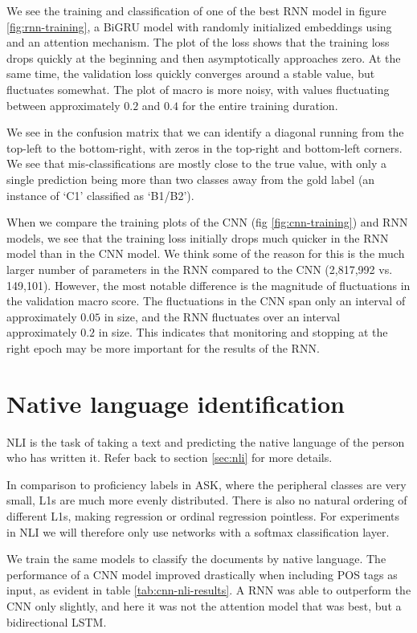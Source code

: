 We see the training and classification of one of the best RNN model in figure
\ref{fig:rnn-training}, a BiGRU model with randomly initialized embeddings
using and an attention mechanism. The plot of the loss shows that the
training loss drops quickly at the beginning and then asymptotically
approaches zero. At the same time, the validation loss quickly converges
around a stable value, but fluctuates somewhat. The plot of macro \FI is more
noisy, with values fluctuating between approximately $0.2$ and $0.4$ for the
entire training duration.

We see in the confusion matrix that we can identify a diagonal running from
the top-left to the bottom-right, with zeros in the top-right and bottom-left
corners. We see that mis-classifications are mostly close to the true value,
with only a single prediction being more than two classes away from the gold
label (an instance of `C1' classified as `B1/B2').

When we compare the training plots of the CNN (fig \ref{fig:cnn-training})
and RNN models, we see that the training loss initially drops much quicker in
the RNN model than in the CNN model. We think some of the reason for this is
the much larger number of parameters in the RNN compared to the CNN
(2,817,992 vs. 149,101). However, the most notable difference is the
magnitude of fluctuations in the validation macro \FI score. The fluctuations
in the CNN span only an interval of approximately $0.05$ in size, and the RNN
fluctuates over an interval approximately $0.2$ in size. This indicates that
monitoring \FI and stopping at the right epoch may be more important for the
results of the RNN.


\section{Native language identification} \label{sec:nli-experiments}

\ac{NLI} is the task of taking a text and predicting the native language of
the person who has written it. Refer back to section \ref{sec:nli} for more
details.

In comparison to proficiency labels in ASK, where the peripheral classes are
very small, \acp{L1} are much more evenly distributed. There is also no
natural ordering of different \acp{L1}, making regression or ordinal
regression pointless. For experiments in \ac{NLI} we will therefore only use
networks with a softmax classification layer.

We train the same models to classify the documents by native language. The
performance of a \ac{CNN} model improved drastically when including \ac{POS}
tags as input, as evident in table \ref{tab:cnn-nli-results}.
A RNN was able to outperform the CNN only slightly, and here it was not the
attention model that was best, but a bidirectional LSTM.

